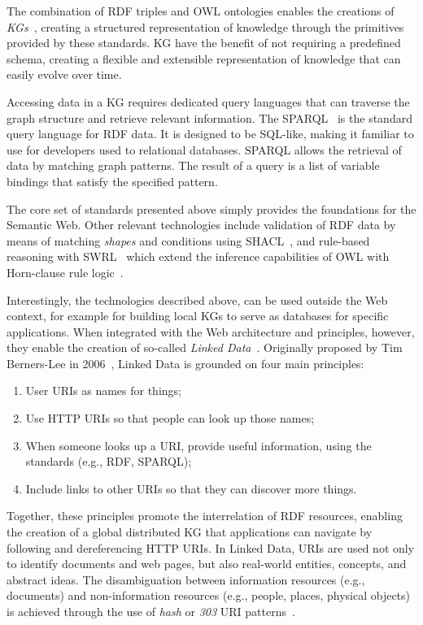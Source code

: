 The combination of \ac{RDF} triples and \ac{OWL} ontologies enables the creations of \emph{\acp{KG}}~\cite{KG_Book:21}, creating a structured representation of knowledge through the primitives provided by these standards.
%
\ac{KG} have the benefit of not requiring a predefined schema, creating a flexible and extensible representation of knowledge that can easily evolve over time. 


Accessing data in a \ac{KG} requires dedicated query languages that can traverse the graph structure and retrieve relevant information.
%
The \ac{SPARQL}~\cite{sparql} is the standard query language for \ac{RDF} data. It is designed to be SQL-like, making it familiar to use for developers used to relational databases.
%
\ac{SPARQL} allows the retrieval of data by matching graph patterns. The result of a query is a list of variable bindings that satisfy the specified pattern. 

The core set of standards presented above simply provides the foundations for the Semantic Web. 
%
Other relevant technologies include validation of \ac{RDF} data by means of matching \emph{shapes} and conditions using \ac{SHACL}~\cite{shacl}, and rule-based reasoning with \ac{SWRL}~\cite{swrl} which extend the inference capabilities of \ac{OWL} with Horn-clause rule logic~\cite{Horn_1951}.

Interestingly, the technologies described above, can be used outside the Web context, for example for building local \acp{KG} to serve as databases for specific applications. 
%
When integrated with the Web architecture and principles, however, they enable the creation of so-called \emph{Linked Data}~\cite{Bizer_Heath_Berners-Lee_2023}.
%
Originally proposed by Tim Berners-Lee in 2006~\cite{berners-lee2006linkeddata}, Linked Data is grounded on four main principles:
\begin{enumerate}
    \item User \acp{URI} as names for things;
    \item Use \ac{HTTP} \acp{URI} so that people can look up those names;
    \item When someone looks up a \ac{URI}, provide useful information, using the standards (e.g., \ac{RDF}, \ac{SPARQL});
    \item Include links to other \acp{URI} so that they can discover more things.
\end{enumerate}

Together, these principles promote the interrelation of \ac{RDF} resources, enabling the creation of a global distributed \ac{KG} that applications can navigate by following and dereferencing \ac{HTTP} \acp{URI}. 
%
In Linked Data, \acp{URI} are used not only to identify documents and web pages, but also real-world entities, concepts, and abstract ideas.
%
The disambiguation between information resources (e.g., documents) and non-information resources (e.g., people, places, physical objects) is achieved through the use of \emph{hash} or \emph{303} \ac{URI} patterns~\cite{cool-uris}.

